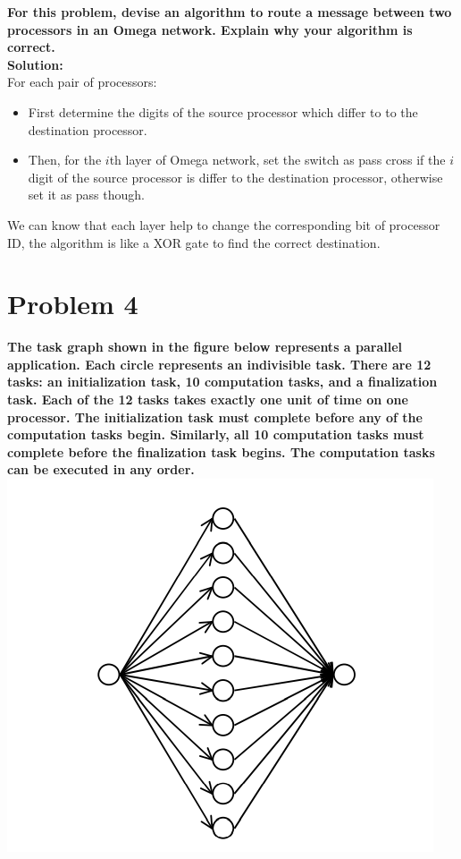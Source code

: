 \documentclass{article}
\begin{document}
\textcolor[rgb]{0,0,1}{\textbf{For this problem, devise an algorithm to route a message between two 
processors in an Omega network. Explain why your algorithm is correct. \\}}
\textbf{Solution: }\\
For each pair of processors:
\begin{itemize}
	\item First determine the digits of the source processor which differ to to the destination processor.
	\item Then, for the $i$th layer of Omega network, set the switch as pass cross if the $i$ digit of the source processor is differ to the destination processor, otherwise set it as pass though.
\end{itemize}
We can know that each layer help to change the corresponding bit of processor ID, the algorithm is like a XOR gate to find the correct destination.

\section{Problem 4}
\textcolor[rgb]{0,0,1}{\textbf{The task graph shown in the figure below represents a parallel application. Each circle represents an indivisible task. There are 12 tasks: an initialization task, 10 
computation tasks, and a finalization task. Each of the 12 tasks takes exactly one unit of time on one processor. The initialization task must complete before any of the computation tasks begin. Similarly, all 10 computation tasks must complete before the finalization task begins. The computation tasks can be 
executed in any order.\\}}
\includegraphics[scale=0.6]{fig3.png}\\
\end{document}
